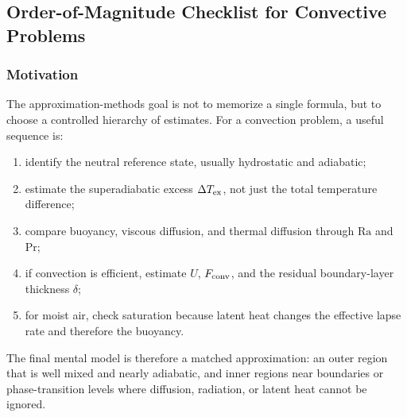 \subsection{Order-of-Magnitude Checklist for Convective Problems}
\label{sec:lec08:oom-checklist}

\subsubsection*{Motivation}
The approximation-methods goal is not to memorize a single formula, but to
choose a controlled hierarchy of estimates. For a convection problem, a useful
sequence is:
\begin{enumerate}
    \item identify the neutral reference state, usually hydrostatic and
    adiabatic;
    \item estimate the superadiabatic excess $\Delta T_{\rm ex}$, not just the
    total temperature difference;
    \item compare buoyancy, viscous diffusion, and thermal diffusion through
    $\mathrm{Ra}$ and $\mathrm{Pr}$;
    \item if convection is efficient, estimate $U$, $F_{\rm conv}$, and the
    residual boundary-layer thickness $\delta$;
    \item for moist air, check saturation because latent heat changes the
    effective lapse rate and therefore the buoyancy.
\end{enumerate}


The final mental model is therefore a matched approximation: an outer region
that is well mixed and nearly adiabatic, and inner regions near boundaries or
phase-transition levels where diffusion, radiation, or latent heat cannot be
ignored.
